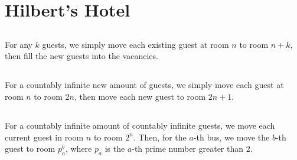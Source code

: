 \documentclass{article}
\begin{document}
\section{Hilbert's Hotel}

\subsection{}

For any \(k\) guests, we simply move each existing guest at room \(n\) to room \(n + k\), then fill the new guests into the vacancies.

\subsection{}

For a countably infinite new amount of guests, we simply move each guest at room \(n\) to room \(2n\), then move each new guest to room \(2n + 1\).

\subsection{}

For a countably infinite amount of countably infinite guests, we move each current guest in room \(n\) to room \(2^n\).
Then, for the \(a\)-th bus, we move the \(b\)-th guest to room \(p_a^b\), where \(p_a\) is the \(a\)-th prime number greater than \(2\).
\end{document}
